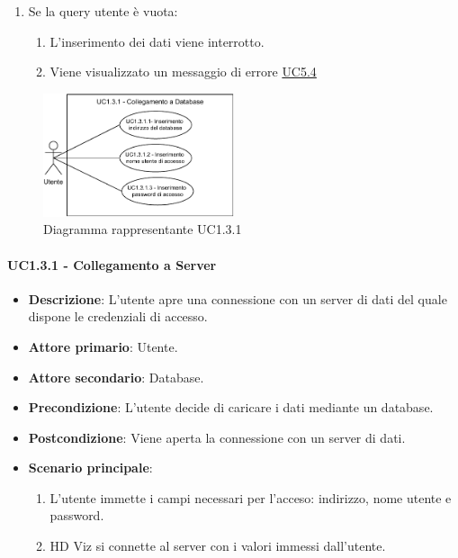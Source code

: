 \begin{itemize}
\begin{enumerate}
        \item Se la query utente è vuota:
        \begin{enumerate}
            \item L'inserimento dei dati viene interrotto.
            \item Viene visualizzato un messaggio di errore \hyperref[ssub:uc5.4]{UC5.4}
        \end{enumerate}
    \end{enumerate}
\end{itemize}


\newpage
\begin{figure}[h]
    \centering
    \includegraphics[width=0.5\textwidth]{componenti/casi-duso/diagrammi/UC1_3_1.pdf}
    \caption{Diagramma rappresentante UC1.3.1}
    \label{fig:UC1.3}
\end{figure}


\paragraph{UC1.3.1 - Collegamento a Server}
\label{par:uc1.3.1}
\begin{itemize}
    \item \textbf{Descrizione}: L'utente apre una connessione con un server di dati del quale 
                                dispone le credenziali di accesso. 

    \item \textbf{Attore primario}: Utente.
    \item \textbf{Attore secondario}: Database.
    
    \item \textbf{Precondizione}:   L'utente decide di caricare i dati mediante un database.
    \item \textbf{Postcondizione}:  Viene aperta la connessione con un server di dati.

	\item \textbf{Scenario principale}:
		\begin{enumerate}
			\item L'utente immette i campi necessari per l'acceso: indirizzo, nome utente e password.
			\item HD Viz si connette al server con i valori immessi dall'utente.
        \end{enumerate}
    \end{itemize}


